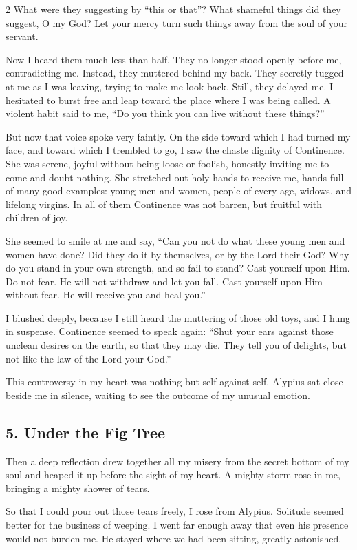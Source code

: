 \documentclass[12pt]{article}
\begin{document}
\begin{multicols}{2}
What were they suggesting by ``this or that''? What shameful things did they suggest, O my God? Let your mercy turn such things away from the soul of your servant.

Now I heard them much less than half. They no longer stood openly before me, contradicting me. Instead, they muttered behind my back. They secretly tugged at me as I was leaving, trying to make me look back. Still, they delayed me. I hesitated to burst free and leap toward the place where I was being called. A violent habit said to me, ``Do you think you can live without these things?''

But now that voice spoke very faintly. On the side toward which I had turned my face, and toward which I trembled to go, I saw the chaste dignity of Continence. She was serene, joyful without being loose or foolish, honestly inviting me to come and doubt nothing. She stretched out holy hands to receive me, hands full of many good examples: young men and women, people of every age, widows, and lifelong virgins. In all of them Continence was not barren, but fruitful with children of joy.

She seemed to smile at me and say, ``Can you not do what these young men and women have done? Did they do it by themselves, or by the Lord their God? Why do you stand in your own strength, and so fail to stand? Cast yourself upon Him. Do not fear. He will not withdraw and let you fall. Cast yourself upon Him without fear. He will receive you and heal you.''

I blushed deeply, because I still heard the muttering of those old toys, and I hung in suspense. Continence seemed to speak again: ``Shut your ears against those unclean desires on the earth, so that they may die. They tell you of delights, but not like the law of the Lord your God.''

This controversy in my heart was nothing but self against self. Alypius sat close beside me in silence, waiting to see the outcome of my unusual emotion.

\subsection*{5. Under the Fig Tree}
Then a deep reflection drew together all my misery from the secret bottom of my soul and heaped it up before the sight of my heart. A mighty storm rose in me, bringing a mighty shower of tears.

So that I could pour out those tears freely, I rose from Alypius. Solitude seemed better for the business of weeping. I went far enough away that even his presence would not burden me. He stayed where we had been sitting, greatly astonished.


\end{multicols}
\end{document}
